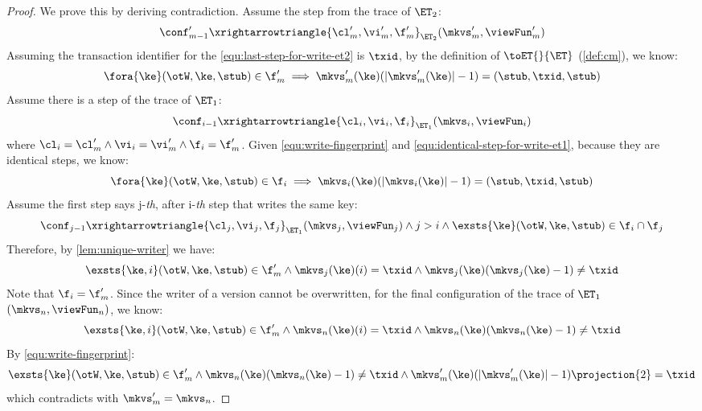 \begin{proof}
    We prove this by deriving contradiction.
    Assume the step from the trace of \( \ET_2 \):
    \begin{equation}
        \label{equ:last-step-for-write-et2}
        \conf'_{m-1} \xrightarrowtriangle{\cl'_m, \vi'_m, \f'_m}_{\ET_{2}} (\mkvs'_m, \viewFun'_m )
    \end{equation}
    Assuming the transaction identifier for the \cref{equ:last-step-for-write-et2} is \( \txid \), by the definition of \( \toET{}{\ET}\) (\cref{def:cm}), we know:
    \begin{equation}
        \label{equ:write-fingerprint}
        \fora{\ke} (\otW, \ke, \stub) \in \f'_m \implies \mkvs'_m(\ke)(\lvert\mkvs'_m(\ke)\rvert - 1) = (\stub, \txid, \stub)
    \end{equation}
    Assume there is a step of the trace of \( \ET_1 \):
    \begin{equation}
        \label{equ:identical-step-for-write-et1}
        \conf_{i-1} \xrightarrowtriangle{\cl_i, \vi_i, \f_i}_{\ET_{1}} (\mkvs_i, \viewFun_i)
    \end{equation}
    where \( \cl_i = \cl'_m \land \vi_i = \vi'_m \land \f_i = \f'_m \).
    Given \cref{equ:write-fingerprint} and \cref{equ:identical-step-for-write-et1}, because they are identical steps, we know:
    \[
        \fora{\ke} (\otW, \ke, \stub) \in \f_i \implies \mkvs_i(\ke)(\lvert\mkvs_i(\ke)\rvert - 1) = (\stub, \txid, \stub)
    \]
    Assume the first step says j-\emph{th}, after i-\emph{th} step that writes the same key:
    \[
        \conf_{j-1} \xrightarrowtriangle{\cl_j, \vi_j, \f_j}_{\ET_{1}} (\mkvs_j, \viewFun_j) 
        \land j > i
        \land \exsts{\ke} (\otW, \ke, \stub) \in \f_i \cap \f_j
    \]
    Therefore, by \cref{lem:unique-writer} we have:
    \[
        \exsts{\ke,i} (\otW, \ke, \stub) \in \f'_m \land \mkvs_j(\ke)(i) = \txid \land \mkvs_j(\ke)(\mkvs_j(\ke) - 1) \neq \txid
    \]
    Note that \( \f_i = \f'_m\).
    Since the writer of a version cannot be overwritten, for the final configuration of the trace of \( \ET_1 \) \((\mkvs_n, \viewFun_n)\), we know:
    \[
        \exsts{\ke,i} (\otW, \ke, \stub) \in \f'_m \land \mkvs_n(\ke)(i) = \txid \land \mkvs_n(\ke)(\mkvs_n(\ke) - 1) \neq \txid
    \]
    By \cref{equ:write-fingerprint}:
    \[
        \exsts{\ke} (\otW, \ke, \stub) \in \f'_m \land \mkvs_n(\ke)(\mkvs_n(\ke) - 1) \neq \txid \land \mkvs'_m(\ke)(\lvert\mkvs'_m(\ke)\rvert - 1)\projection{2} = \txid
    \]
    which contradicts with \( \mkvs'_m = \mkvs_n\).
\end{proof}

